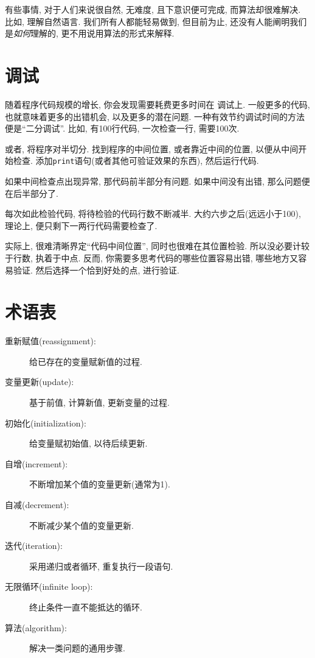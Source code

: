 \documentclass[10pt]{book}
\begin{document}
有些事情, 对于人们来说很自然, 无难度, 且下意识便可完成, 
而算法却很难解决. 
比如, 理解自然语言. 我们所有人都能轻易做到, 
但目前为止, 还没有人能阐明我们是{\em 如何}理解的, 
更不用说用算法的形式来解释. 

\section{调试}
\label{bisectbug}
随着程序代码规模的增长, 你会发现需要耗费更多时间在
调试上. 一般更多的代码, 也就意味着更多的出错机会, 
以及更多的潜在问题. 
一种有效节约调试时间的方法便是``二分调试''.
比如, 有100行代码, 一次检查一行, 需要100次. 

或者, 将程序对半切分. 找到程序的中间位置, 或者靠近中间的位置, 
以便从中间开始检查. 添加{\tt print}语句(或者其他可验证效果的东西), 
然后运行代码. 

如果中间检查点出现异常, 那代码前半部分有问题. 
如果中间没有出错, 那么问题便在后半部分了. 

每次如此检验代码, 将待检验的代码行数不断减半. 大约六步之后(远远小于100), 
理论上, 便只剩下一两行代码需要检查了. 

实际上, 很难清晰界定``代码中间位置'', 同时也很难在其位置检验. 
所以没必要计较于行数, 执着于中点. 
反而, 你需要多思考代码的哪些位置容易出错, 哪些地方又容易验证. 
然后选择一个恰到好处的点, 进行验证. 



\section{术语表}

\begin{description}

\item[重新赋值(reassignment):] 给已存在的变量赋新值的过程. 

\item[变量更新(update):] 基于前值, 计算新值, 更新变量的过程. 

\item[初始化(initialization):] 给变量赋初始值, 以待后续更新. 

\item[自增(increment):] 不断增加某个值的变量更新(通常为1). 

\item[自减(decrement):] 不断减少某个值的变量更新. 

\item[迭代(iteration):] 采用递归或者循环, 重复执行一段语句. 

\item[无限循环(infinite loop):] 终止条件一直不能抵达的循环. 

\item[算法(algorithm):]  解决一类问题的通用步骤. 

\end{description}
\end{document}
